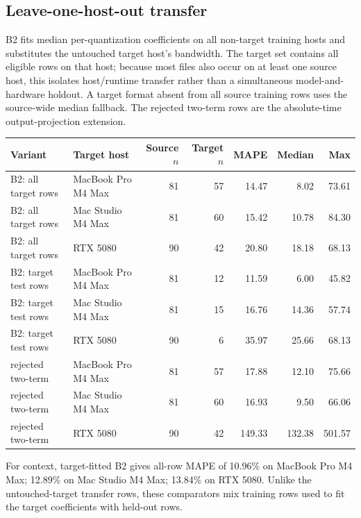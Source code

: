 \documentclass[10pt]{article}
\begin{document}
\subsection{Leave-one-host-out transfer}
B2 fits median per-quantization coefficients on all non-target training hosts and substitutes the untouched target host's bandwidth. The target set contains all eligible rows on that host; because most files also occur on at least one source host, this isolates host/runtime transfer rather than a simultaneous model-and-hardware holdout. A target format absent from all source training rows uses the source-wide median fallback. The rejected two-term rows are the absolute-time output-projection extension.
\begin{center}
\small
\begin{tabular}{llrrrrr}
\toprule
Variant & Target host & Source $n$ & Target $n$ & MAPE & Median & Max\\
\midrule
B2: all target rows & MacBook Pro M4 Max & 81 & 57 & 14.47 & 8.02 & 73.61 \\
B2: all target rows & Mac Studio M4 Max & 81 & 60 & 15.42 & 10.78 & 84.30 \\
B2: all target rows & RTX 5080 & 90 & 42 & 20.80 & 18.18 & 68.13 \\
B2: target test rows & MacBook Pro M4 Max & 81 & 12 & 11.59 & 6.00 & 45.82 \\
B2: target test rows & Mac Studio M4 Max & 81 & 15 & 16.76 & 14.36 & 57.74 \\
B2: target test rows & RTX 5080 & 90 & 6 & 35.97 & 25.66 & 68.13 \\
rejected two-term & MacBook Pro M4 Max & 81 & 57 & 17.88 & 12.10 & 75.66 \\
rejected two-term & Mac Studio M4 Max & 81 & 60 & 16.93 & 9.50 & 66.06 \\
rejected two-term & RTX 5080 & 90 & 42 & 149.33 & 132.38 & 501.57 \\
\bottomrule
\end{tabular}
\end{center}
For context, target-fitted B2 gives all-row MAPE of 10.96\% on MacBook Pro M4 Max; 12.89\% on Mac Studio M4 Max; 13.84\% on RTX 5080. Unlike the untouched-target transfer rows, these comparators mix training rows used to fit the target coefficients with held-out rows.
\end{document}
